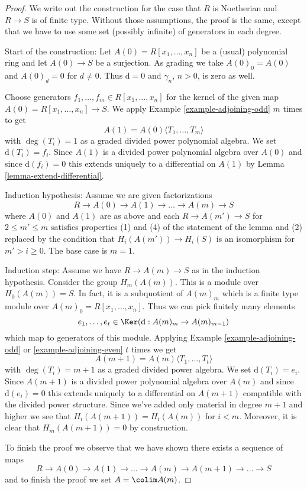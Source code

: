 \begin{proof}
We write out the construction for the case that $R$ is Noetherian
and $R\to S$ is of finite type. Without those assumptions, the proof
is the same, except that we have to use some set (possibly
infinite) of generators in each degree.

\medskip\noindent
Start of the construction: Let $A(0) = R[x_1, \ldots, x_n]$ be
a (usual) polynomial ring and let $A(0) \to S$ be a surjection.
As grading we take $A(0)_0 = A(0)$ and $A(0)_d = 0$ for $d \not = 0$.
Thus $\text{d} = 0$ and $\gamma_n$, $n > 0$, is zero as well.

\medskip\noindent
Choose generators $f_1, \ldots, f_m \in R[x_1, \ldots, x_n]$
for the kernel of the given map $A(0) = R[x_1, \ldots, x_n] \to S$.
We apply Example \ref{example-adjoining-odd} $m$ times to get
$$
A(1) = A(0)\langle T_1, \ldots, T_m\rangle
$$
with $\deg(T_i) = 1$ as a graded divided power polynomial algebra.
We set $\text{d}(T_i) = f_i$. Since $A(1)$ is a divided power polynomial
algebra over $A(0)$ and since $\text{d}(f_i) = 0$
this extends uniquely to a differential on $A(1)$ by
Lemma \ref{lemma-extend-differential}.

\medskip\noindent
Induction hypothesis: Assume we are given factorizations
$$
R \to A(0) \to A(1) \to \ldots \to A(m) \to S
$$
where $A(0)$ and $A(1)$ are as above and each $R \to A(m') \to S$
for $2 \leq m' \leq m$ satisfies properties (1) and (4)
of the statement of the lemma and (2) replaced by the condition that
$H_i(A(m')) \to H_i(S)$ is an isomorphism for
$m' > i \geq 0$. The base case is $m = 1$.

\medskip\noindent
Induction step: Assume we have $R \to A(m) \to S$
as in the induction hypothesis. Consider the
group $H_m(A(m))$. This is a module over $H_0(A(m)) = S$.
In fact, it is a subquotient of $A(m)_m$ which is a finite
type module over $A(m)_0 = R[x_1, \ldots, x_n]$.
Thus we can pick finitely many elements
$$
e_1, \ldots, e_t \in \Ker(\text{d} : A(m)_m \to A(m)_{m - 1})
$$
which map to generators of this module. Applying
Example \ref{example-adjoining-odd} or
\ref{example-adjoining-even} $t$ times we get
$$
A(m + 1) = A(m)\langle T_1, \ldots, T_t\rangle
$$
with $\deg(T_i) = m + 1$ as a graded divided power algebra. We set
$\text{d}(T_i) = e_i$. Since $A(m+1)$ is a divided power polynomial
algebra over $A(m)$ and since $\text{d}(e_i) = 0$
this extends uniquely to a differential on $A(m + 1)$
compatible with the divided power structure.
Since we've added only material in degree $m + 1$ and higher we see
that $H_i(A(m + 1)) = H_i(A(m))$ for $i < m$. Moreover, it is
clear that $H_m(A(m + 1)) = 0$ by construction.

\medskip\noindent
To finish the proof we observe that we have shown there exists
a sequence of maps
$$
R \to A(0) \to A(1) \to \ldots \to A(m) \to A(m + 1) \to \ldots \to S
$$
and to finish the proof we set $A = \colim A(m)$.
\end{proof}


